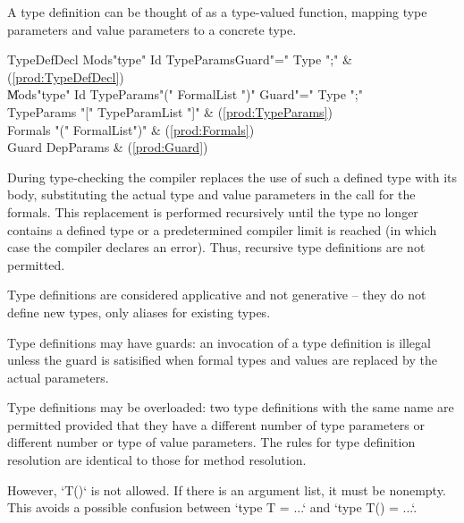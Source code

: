 A type definition can be thought of as a type-valued function,
mapping type parameters and value parameters to a concrete type.

\begin{bbgrammar}
         TypeDefDecl \: Mods\opt \xcd"type" Id TypeParams\opt Guard\opt \xcd"=" Type \xcd";" & (\ref{prod:TypeDefDecl}) \\
                     \| Mods\opt \xcd"type" Id TypeParams\opt \xcd"(" FormalList \xcd")" Guard\opt \xcd"=" Type \xcd";" \\
          TypeParams \: \xcd"[" TypeParamList \xcd"]" & (\ref{prod:TypeParams}) \\
             Formals \: \xcd"(" FormalList\opt \xcd")" & (\ref{prod:Formals}) \\
               Guard \: DepParams & (\ref{prod:Guard}) \\
\end{bbgrammar}

\noindent 
During type-checking the compiler replaces the use of such a defined
type with its body, substituting the actual type and value parameters
in the call for the formals. This replacement is performed recursively
until the type no longer contains a defined type or a predetermined
compiler limit is reached (in which case the compiler declares an
error). Thus, recursive type definitions are not permitted.

Type definitions are considered applicative and not generative --
they do not define new types, only aliases for existing types.

\label{TypeDefGuard}
Type definitions may have guards: an invocation of a type definition
is illegal unless the guard is satisified when formal types and values
are replaced by the actual parameters.

Type definitions may be overloaded: two type definitions with
the same name are permitted provided that they have a different number
of type parameters or different number or type of value parameters.  The rules
for type definition resolution are identical to those for method resolution.

However, \xcd`T()` is not allowed. If there is an argument list, it must be
nonempty.  This avoids a possible confusion between 
\xcd`type T = ...` and \xcd`type T() = ...`.  

